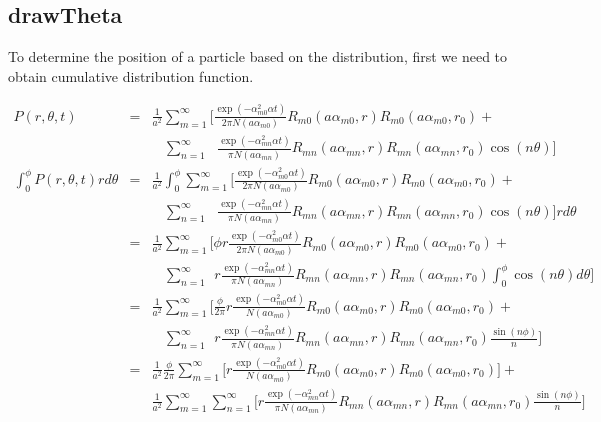 \documentclass{article}
\begin{document}
\subsection{drawTheta}
To determine the position of a particle based on the distribution, first we need
to obtain cumulative distribution function.

\begin{eqnarray}
    P(r, \theta, t) &=&
    \frac{1}{a^2} \sum_{m=1}^{\infty} \Bigg[
    \frac{\exp(-\alpha_{m0}^2\alpha t)}{2\pi N(a\alpha_{m0})}
    R_{m0}(a\alpha_{m0}, r) R_{m0}(a\alpha_{m0}, r_0) +
\nonumber\\
    & &\ \ \ \ \sum_{n=1}^{\infty}\ \ \ 
    \frac{\exp(-\alpha_{mn}^2\alpha t)}{\pi N(a\alpha_{mn})}
    R_{mn}(a\alpha_{mn}, r) R_{mn}(a\alpha_{mn}, r_0)\cos(n\theta)\Bigg]
\nonumber\\
    \int_0^{\phi} P(r, \theta, t) rd\theta
    &=& \frac{1}{a^2} \int_0^{\phi} \sum_{m=1}^{\infty} \Bigg[
    \frac{\exp(-\alpha_{m0}^2\alpha t)}{2\pi N(a\alpha_{m0})}
    R_{m0}(a\alpha_{m0}, r) R_{m0}(a\alpha_{m0}, r_0) +
\nonumber\\
    & &\ \ \ \ \sum_{n=1}^{\infty}\ \ \ 
    \frac{\exp(-\alpha_{mn}^2\alpha t)}{\pi N(a\alpha_{mn})}
    R_{mn}(a\alpha_{mn}, r) R_{mn}(a\alpha_{mn}, r_0)\cos(n\theta)\Bigg] rd\theta
\nonumber\\
    &=& \frac{1}{a^2}  \sum_{m=1}^{\infty} \Bigg[
    \phi r\frac{\exp(-\alpha_{m0}^2\alpha t)}{2\pi N(a\alpha_{m0})}
    R_{m0}(a\alpha_{m0}, r) R_{m0}(a\alpha_{m0}, r_0) +
\nonumber\\
    & &\ \ \ \ \sum_{n=1}^{\infty}\ \ r
    \frac{\exp(-\alpha_{mn}^2\alpha t)}{\pi N(a\alpha_{mn})}
    R_{mn}(a\alpha_{mn}, r) R_{mn}(a\alpha_{mn}, r_0)
    \int_0^\phi\cos(n\theta) d\theta
    \Bigg]
\nonumber\\
    &=& \frac{1}{a^2}  \sum_{m=1}^{\infty} \Bigg[
    \frac{\phi}{2\pi} r\frac{\exp(-\alpha_{m0}^2\alpha t)}{N(a\alpha_{m0})}
    R_{m0}(a\alpha_{m0}, r) R_{m0}(a\alpha_{m0}, r_0) +
\nonumber\\
    & &\ \ \ \ \sum_{n=1}^{\infty}\ \ r
    \frac{\exp(-\alpha_{mn}^2\alpha t)}{\pi N(a\alpha_{mn})}
    R_{mn}(a\alpha_{mn}, r) R_{mn}(a\alpha_{mn}, r_0) \frac{\sin(n\phi)}{n}
    \Bigg]
\nonumber\\
    &=& \frac{1}{a^2} \frac{\phi}{2\pi} \sum_{m=1}^{\infty} \Bigg[
    r\frac{\exp(-\alpha_{m0}^2\alpha t)}{N(a\alpha_{m0})}
    R_{m0}(a\alpha_{m0}, r) R_{m0}(a\alpha_{m0}, r_0)\Bigg] +
\nonumber\\
    & & \frac{1}{a^2} \sum_{m=1}^{\infty}\sum_{n=1}^{\infty}\Bigg[
    r \frac{\exp(-\alpha_{mn}^2\alpha t)}{\pi N(a\alpha_{mn})}
    R_{mn}(a\alpha_{mn}, r) R_{mn}(a\alpha_{mn}, r_0) \frac{\sin(n\phi)}{n}
    \Bigg]
\end{eqnarray}
\end{document}
